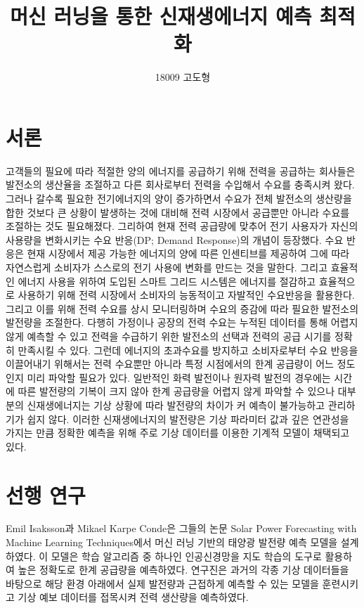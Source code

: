 \documentclass{article}
\begin{document}

\title{머신 러닝을 통한 신재생에너지 예측 최적화}
\author{18009 고도형}
\maketitle



\section{서론}
고객들의 필요에 따라 적절한 양의 에너지를 공급하기 위해 전력을 공급하는 회사들은 발전소의 생산율을 조절하고 다른 회사로부터 전력을 수입해서 수요를 충족시켜 왔다. 그러나 갈수록 필요한 전기에너지의 양이 증가하면서 수요가 전체 발전소의 생산량을 합한 것보다 큰 상황이 발생하는 것에 대비해 전력 시장에서 공급뿐만 아니라 수요를 조절하는 것도 필요해졌다. 그리하여 현재 전력 공급량에 맞추어 전기 사용자가 자신의 사용량을 변화시키는 수요 반응(DP; Demand Response)의 개념이 등장했다. 수요 반응은 현재 시장에서 제공 가능한 에너지의 양에 따른 인센티브를 제공하여 그에 따라 자연스럽게 소비자가 스스로의 전기 사용에 변화를 만드는 것을 말한다. 그리고 효율적인 에너지 사용을 위하여 도입된 스마트 그리드 시스템은 에너지를 절감하고 효율적으로 사용하기 위해 전력 시장에서 소비자의 능동적이고 자발적인 수요반응을 활용한다. 그리고 이를 위해 전력 수요를 상시 모니터링하며 수요의 증감에 따라 필요한 발전소의 발전량을 조절한다. 다행히 가정이나 공장의 전력 수요는 누적된 데이터를 통해 어렵지 않게 예측할 수 있고 전력을 수급하기 위한 발전소의 선택과 전력의 공급 시기를 정확히 만족시킬 수 있다. \newline
그런데 에너지의 초과수요를 방지하고 소비자로부터 수요 반응을 이끌어내기 위해서는 전력 수요뿐만 아니라 특정 시점에서의 한계 공급량이 어느 정도인지 미리 파악할 필요가 있다. 일반적인 화력 발전이나 원자력 발전의 경우에는 시간에 따른 발전량의 기복이 크지 않아 한계 공급량을 어렵지 않게 파악할 수 있으나 대부분의 신재생에너지는 기상 상황에 따라 발전량의 차이가 커 예측이 불가능하고 관리하기가 쉽지 않다. 이러한 신재생에너지의 발전량은 기상 파라미터 값과 깊은 연관성을 가지는 만큼 정확한 예측을 위해 주로 기상 데이터를 이용한 기계적 모델이 채택되고 있다.



\section{선행 연구}
Emil Isaksson과 Mikael Karpe Conde은 그들의 논문 Solar Power Forecasting with Machine Learning Techniques에서 머신 러닝 기반의 태양광 발전량 예측 모델을 설계하였다. 이 모델은 학습 알고리즘 중 하나인 인공신경망을 지도 학습의 도구로 활용하여 높은 정확도로 한계 공급량을 예측하였다. 연구진은 과거의 각종 기상 데이터들을 바탕으로 해당 환경 아래에서 실제 발전량과 근접하게 예측할 수 있는 모델을 훈련시키고 기상 예보 데이터를 접목시켜 전력 생산량을 예측하였다.
\end{document}

